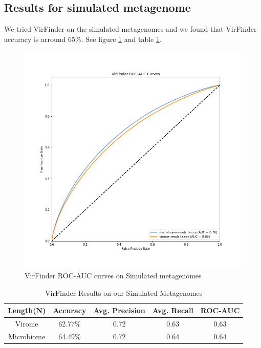 \documentclass[conference]{IEEEtran}
\begin{document}
\subsection{Results for simulated metagenome}
We tried VirFinder on the simulated metagenomes and we found that VirFinder accuracy is arround 65\%. See figure \ref{fig:roc_auc_virfinder_simulated} and table \ref{table:virfinder_results_simulated}.

\begin{figure}
	\centering
	\includegraphics[width=\columnwidth]{imgs/roc_auc_simulated.png}
	\caption{VirFinder ROC-AUC curves on Simulated metagenomes}
	\label{fig:roc_auc_virfinder_simulated}
\end{figure}



\begin{table}[h!]
	\centering
	\begin{tabular}{||c c c c c||} 
		Length(N) &	Accuracy & Avg. Precision & Avg. Recall &	ROC-AUC \\ [0.5ex] 
		\hline\hline
		Virome &	62.77\%	& 0.72 & 0.63 & 0.63 \\
		Microbiome &	64.49\% &	0.72 & 0.64 & 0.64 \\ [1ex]
	\end{tabular}
	\caption{VirFinder Results on our Simulated Metagenomes}
	\label{table:virfinder_results_simulated}
\end{table}
\end{document}
